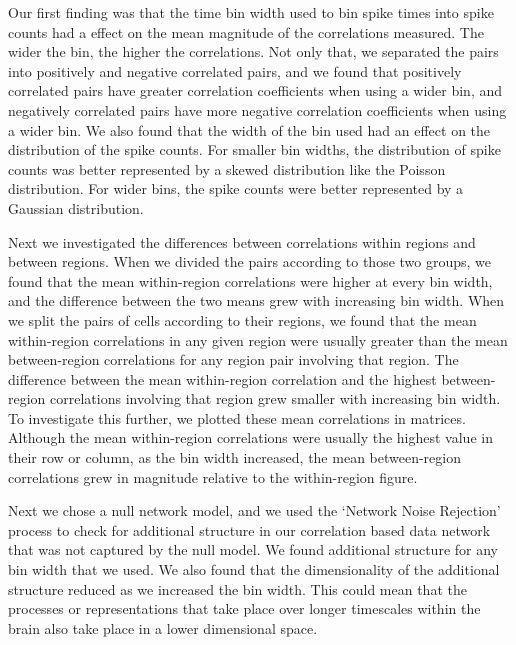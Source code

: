 Our first finding was that the time bin width used to bin spike times into spike counts had a effect on the mean magnitude of the correlations measured. The wider the bin, the higher the correlations. Not only that, we separated the pairs into positively and negative correlated pairs, and we found that positively correlated pairs have greater correlation coefficients when using a wider bin, and negatively correlated pairs have more negative correlation coefficients when using a wider bin. We also found that the width of the bin used had an effect on the distribution of the spike counts. For smaller bin widths, the distribution of spike counts was better represented by a skewed distribution like the Poisson distribution. For wider bins, the spike counts were better represented by a Gaussian distribution.

Next we investigated the differences between correlations within regions and between regions. When we divided the pairs according to those two groups, we found that the mean within-region correlations were higher at every bin width, and the difference between the two means grew with increasing bin width. When we split the pairs of cells according to their regions, we found that the mean within-region correlations in any given region were usually greater than the mean between-region correlations for any region pair involving that region. The difference between the mean within-region correlation and the highest between-region correlations involving that region grew smaller with increasing bin width. To investigate this further, we plotted these mean correlations in matrices. Although the mean within-region correlations were usually the highest value in their row or column, as the bin width increased, the mean between-region correlations grew in magnitude relative to the within-region figure.

Next we chose a null network model, and we used the `Network Noise Rejection' process \parencite{humphries} to check for additional structure in our correlation based data network that was not captured by the null model. We found additional structure for any bin width that we used. We also found that the dimensionality of the additional structure reduced as we increased the bin width. This could mean that the processes or representations that take place over longer timescales within the brain also take place in a lower dimensional space.

